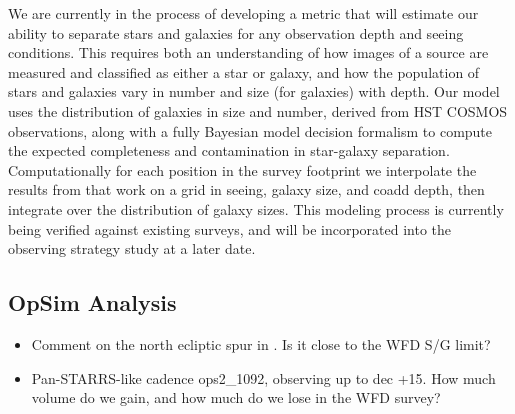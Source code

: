 We are currently in the process of developing a metric that will estimate our
ability to separate stars and galaxies for any observation depth and seeing
conditions. This requires both an understanding of how images of a source are
measured and classified as either a star or galaxy, and how the population of
stars and galaxies vary in number and size (for galaxies) with depth. Our model
uses the distribution of galaxies in size and number, derived from HST COSMOS
observations, along with a fully Bayesian model decision formalism to compute
the expected completeness and contamination in star-galaxy separation.
Computationally for each position in the survey footprint we interpolate the
results from that work on a grid in seeing, galaxy size, and coadd depth, then
integrate over the distribution of galaxy sizes. This modeling process is
currently being verified against existing surveys, and will be incorporated into
the observing strategy study at a later date.


\subsection{OpSim Analysis}
\label{sec:\secname:MW_Halo_analysis}


\begin{itemize}

\item Comment on the north ecliptic spur in . Is it close to the
WFD S/G limit?

\item Pan-STARRS-like cadence ops2\_1092, observing up to dec +15. How much
volume do we gain, and how much do we lose in the WFD survey?
\end{itemize}



